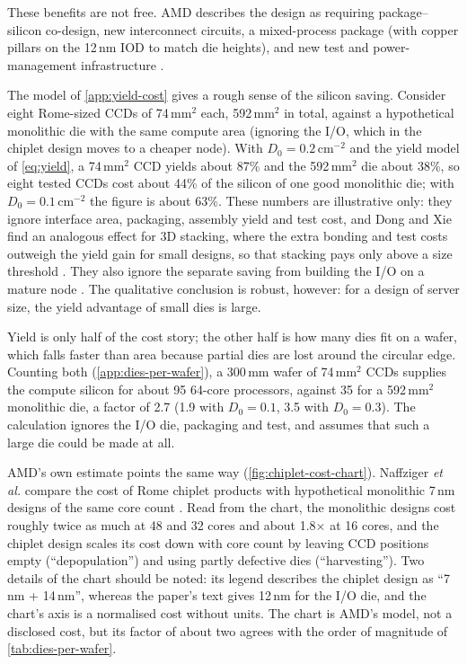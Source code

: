 These benefits are not free. AMD describes the design as requiring package--silicon co-design, new interconnect circuits, a mixed-process package (with copper pillars on the 12\,nm IOD to match die heights), and new test and power-management infrastructure \cite{naffziger2020chiplet}.

The model of \cref{app:yield-cost} gives a rough sense of the silicon saving. Consider eight Rome-sized CCDs of 74\,mm$^2$ each, 592\,mm$^2$ in total, against a hypothetical monolithic die with the same compute area (ignoring the I/O, which in the chiplet design moves to a cheaper node). With $D_0 = 0.2$\,cm$^{-2}$ and the yield model of \cref{eq:yield}, a 74\,mm$^2$ CCD yields about 87\% and the 592\,mm$^2$ die about 38\%, so eight tested CCDs cost about 44\% of the silicon of one good monolithic die; with $D_0 = 0.1$\,cm$^{-2}$ the figure is about 63\%. These numbers are illustrative only: they ignore interface area, packaging, assembly yield and test cost, and Dong and Xie find an analogous effect for 3D stacking, where the extra bonding and test costs outweigh the yield gain for small designs, so that stacking pays only above a size threshold \cite{dongSystemlevelCostAnalysis2009}. They also ignore the separate saving from building the I/O on a mature node \cite{naffziger2020chiplet}. The qualitative conclusion is robust, however: for a design of server size, the yield advantage of small dies is large.

Yield is only half of the cost story; the other half is how many dies fit on a wafer, which falls faster than area because partial dies are lost around the circular edge. Counting both (\cref{app:dies-per-wafer}), a 300\,mm wafer of 74\,mm$^2$ CCDs supplies the compute silicon for about 95 64-core processors, against 35 for a 592\,mm$^2$ monolithic die, a factor of 2.7 (1.9 with $D_0 = 0.1$, 3.5 with $D_0 = 0.3$). The calculation ignores the I/O die, packaging and test, and assumes that such a large die could be made at all.

AMD's own estimate points the same way (\cref{fig:chiplet-cost-chart}). Naffziger \emph{et al.} compare the cost of Rome chiplet products with hypothetical monolithic 7\,nm designs of the same core count \cite[Fig.~2.2.2]{naffziger2020chiplet}. Read from the chart, the monolithic designs cost roughly twice as much at 48 and 32 cores and about 1.8$\times$ at 16 cores, and the chiplet design scales its cost down with core count by leaving CCD positions empty (``depopulation'') and using partly defective dies (``harvesting''). Two details of the chart should be noted: its legend describes the chiplet design as ``7\,nm + 14\,nm'', whereas the paper's text gives 12\,nm for the I/O die, and the chart's axis is a normalised cost without units. The chart is AMD's model, not a disclosed cost, but its factor of about two agrees with the order of magnitude of \cref{tab:dies-per-wafer}.

